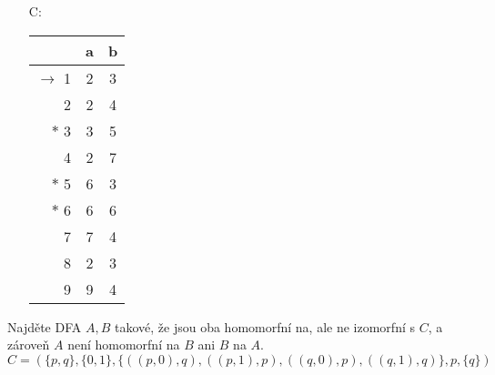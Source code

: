 \documentclass[a4paper,12pt]{amsart}
\begin{document}
\begin{problem}
\begin{multicols}{3}
\begin{itemize}
            \item[C:] \begin{tabular}{ r | c c }
            & a & b \\ \hline
            $\to$ 1 & 2 & 3 \\
            2 & 2 & 4 \\
            $\ast$ 3 & 3 & 5 \\
            4 & 2 & 7 \\
            $\ast$ 5 & 6 & 3 \\
            $\ast$ 6 & 6 & 6 \\
            7 & 7 & 4 \\
            8 & 2 & 3 \\
            9 & 9 & 4
            \end{tabular}
            
        \end{itemize} 

    \end{multicols}

\end{problem}


\vspace{-10pt}
\begin{problem} 
    
    Najděte DFA $A,B$ takové, že jsou oba homomorfní na, ale ne izomorfní s $C$, a zároveň $A$ není homomorfní na $B$ ani $B$ na $A$.
    $$
    C=(\{p,q\},\{0,1\},\{((p,0),q),((p,1),p),((q,0),p),((q,1),q)\},p,\{q\})
    $$

\end{problem}
\end{document}
